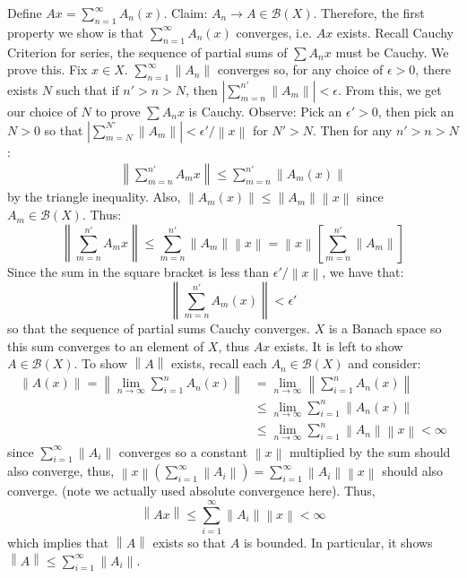 \documentclass{article}
\newcommand{\norm}[1]{\left\lVert#1\right\rVert}
\begin{document}
    Define $Ax = \sum_{n=1}^{\infty} A_n(x)$. Claim: $A_n\to A\in\mathcal{B}(X)$. Therefore, the first property we show
    is that $\sum_{n=1}^{\infty} A_n(x)$ converges, i.e. $Ax$ exists. Recall Cauchy Criterion for series, the sequence of partial
    sums of $\sum A_nx$ must be Cauchy. We prove this. Fix $x\in X$. $\sum_{n=1}^{\infty} \norm{A_n}$ converges so, for any choice
    of $\epsilon>0$, there exists $N$ such that if $n'>n>N$, then $|\sum_{m=n}^{n'}\norm{A_m}|<\epsilon$. From this, we get our
    choice of $N$ to prove $\sum A_nx$ is Cauchy. Observe: Pick an $\epsilon'>0$, then pick an $N>0$ so that
    $|\sum_{m=N}^{N'} \norm{A_m}|<\epsilon'/\norm{x}$ for $N'>N$. Then for any $n'>n>N$:
    \begin{align*}
        \norm{\sum_{m=n}^{n'} A_mx} \leq \sum_{m=n}^{n'} \norm{A_m(x)}
    \end{align*}
    by the triangle inequality. Also, $\norm{A_m(x)} \leq \norm{A_m}\norm{x}$ since $A_m\in\mathcal{B}(X)$. Thus:
    \begin{equation}
        \norm{\sum_{m=n}^{n'} A_mx} \leq \sum_{m=n}^{n'} \norm{A_m}\norm{x} = \norm{x}[\sum_{m=n}^{n'} \norm{A_m}]
    \end{equation}
    Since the sum in the square bracket is less than $\epsilon'/\norm{x}$, we have that:
    \[ \norm{\sum_{m=n}^{n'} A_m(x)} < \epsilon' \]
    so that the sequence of partial sums Cauchy converges. $X$ is a Banach space so this sum converges to an element of $X$, thus
    $Ax$ exists. It is left to show $A\in\mathcal{B}(X)$. To show $\norm{A}$ exists, recall each $A_n\in\mathcal{B}(X)$ and consider:
    \begin{align*}
        \norm{A(x)} = \norm{\lim_{n\to\infty} \sum_{i=1}^n A_n(x)} &= \lim_{n\to\infty}\norm{\sum_{i=1}^n A_n(x)} \\
            &\leq \lim_{n\to\infty} \sum_{i=1}^n \norm{A_n(x)} \\
            &\leq \lim_{n\to\infty} \sum_{i=1}^n \norm{A_n}\norm{x} < \infty
    \end{align*}
    since $\sum_{i=1}^{\infty} \norm{A_i}$ converges so a constant $\norm{x}$ multiplied by the sum should also converge,
    thus, $\norm{x}(\sum_{i=1}^{\infty} \norm{A_i}) = \sum_{i=1}^{\infty} \norm{A_i}\norm{x}$ should also converge. 
    (note we actually used absolute convergence here). Thus,
    \[ \norm{Ax} \leq \sum_{i=1}^{\infty} \norm{A_i}\norm{x} < \infty \]
    which implies that $\norm{A}$ exists so that $A$ is bounded. In particular, it shows $\norm{A}\leq\sum_{i=1}^{\infty}\norm{A_i}$.
\end{document}
